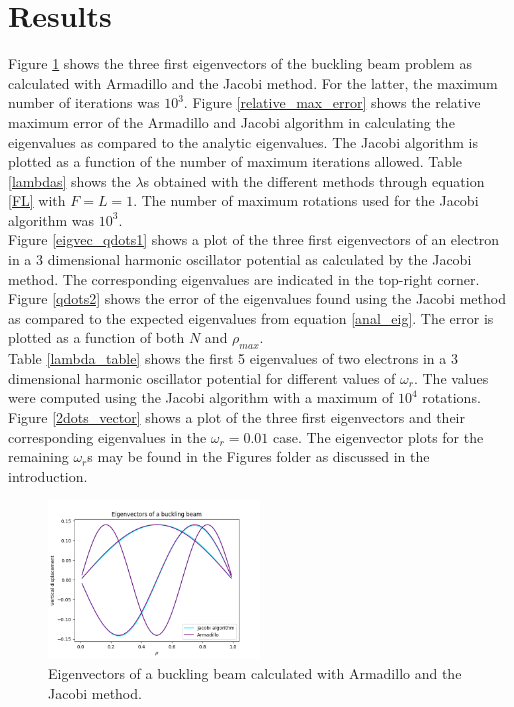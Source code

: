 \documentclass[notitlepage, reprint, nofootinbib]{revtex4-1}
\begin{document}
\section{Results}
Figure \ref{eigenvectors_bb} shows the three first eigenvectors of the buckling beam problem as calculated with Armadillo and the Jacobi method. For the latter, the maximum number of iterations was $10^3$. Figure \ref{relative_max_error} shows the relative maximum error of the Armadillo and Jacobi algorithm in calculating the eigenvalues as compared to the analytic eigenvalues. The Jacobi algorithm is plotted as a function of the number of maximum iterations allowed. Table \ref{lambdas} shows the $\lambda$s obtained with the different methods through equation \ref{FL} with $F=L=1$. The number of maximum rotations used for the Jacobi algorithm was $10^3$. \\[2mm]
Figure \ref{eigvec_qdots1} shows a plot of the three first eigenvectors of an electron in a 3 dimensional harmonic oscillator potential as calculated by the Jacobi method. The corresponding eigenvalues are indicated in the top-right corner. Figure \ref{qdots2} shows the error of the eigenvalues found using the Jacobi method as compared to the expected eigenvalues from equation \ref{anal_eig}. The error is plotted as a function of both $N$ and $\rho_{max}$.\\[2mm]
Table \ref{lambda_table} shows the first 5 eigenvalues of two electrons in a 3 dimensional harmonic oscillator potential for different values of $\omega_r$. The values were computed using the Jacobi algorithm with a maximum of $10^4$ rotations. Figure \ref{2dots_vector} shows a plot of the three first eigenvectors and their corresponding eigenvalues in the $\omega_r=0.01$ case. The eigenvector plots for the remaining $\omega_r$s may be found in the Figures folder as discussed in the introduction.
\begin{figure}[h!]
	\centering
	\includegraphics[width=0.5\textwidth]{../Figures/eigenvectors_buckling_beam.png}
	\caption{Eigenvectors of a buckling beam calculated with Armadillo and the Jacobi method.}
	\label{eigenvectors_bb}
\end{figure}
\end{document}
